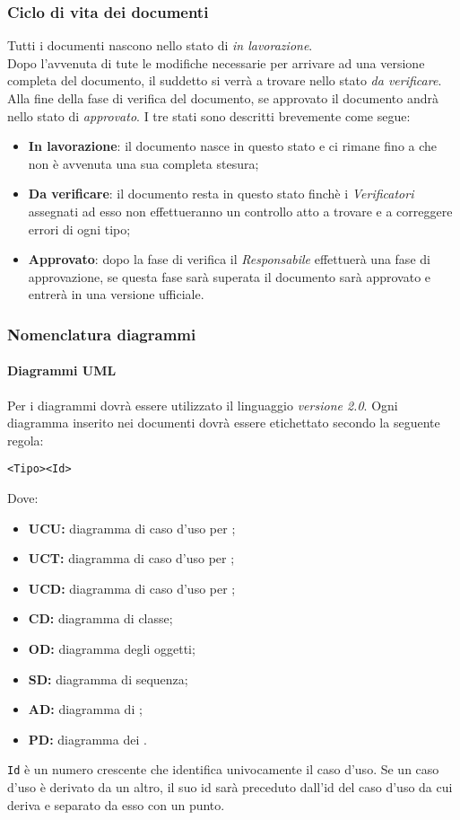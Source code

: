 \documentclass{scalatekids-article}
\begin{document}
\subsubsection{Ciclo di vita dei documenti}
Tutti i documenti nascono nello stato di \textit{in lavorazione}.\\
Dopo l'avvenuta di tute le modifiche necessarie per arrivare ad una versione completa del documento, il suddetto si verrà a trovare nello stato \textit{da verificare}.\\
Alla fine della fase di verifica del documento, se approvato il documento andrà nello stato di \textit{approvato}.
I tre stati sono descritti brevemente come segue:
\begin{itemize}
\item \textbf{In lavorazione}: il documento nasce in questo stato e ci rimane fino a che non è avvenuta una sua completa stesura;
\item \textbf{Da verificare}: il documento resta in questo stato finchè i \textit{Verificatori} assegnati ad esso non effettueranno un controllo atto a trovare e a correggere errori di ogni tipo;
\item \textbf{Approvato}: dopo la fase di verifica il \textit{Responsabile} effettuerà una fase di approvazione, se questa fase sarà superata il documento sarà approvato e entrerà in una versione ufficiale.
\end{itemize}

\subsubsection{Nomenclatura diagrammi}
\paragraph{Diagrammi UML}
Per i diagrammi dovrà essere utilizzato il linguaggio 
\textit{versione 2.0}. Ogni diagramma inserito nei documenti dovrà essere
etichettato secondo la seguente regola:
\begin{center}
  \verb=<Tipo><Id>=
\end{center}
Dove:
\begin{itemize}
\item\textbf{UCU:} diagramma di caso d'uso per ;
\item\textbf{UCT:} diagramma di caso d'uso per ;
\item\textbf{UCD:} diagramma di caso d'uso per ;
\item\textbf{CD:} diagramma di classe;
\item\textbf{OD:} diagramma degli oggetti;
\item\textbf{SD:} diagramma di sequenza;
\item\textbf{AD:} diagramma di ;
\item\textbf{PD:} diagramma dei .
\end{itemize}
\verb=Id= è un numero crescente che identifica
univocamente il caso d'uso. Se un caso d'uso è derivato da un altro, il suo id
sarà preceduto dall'id del caso d'uso da cui deriva e separato da esso con un
punto.
\end{document}
